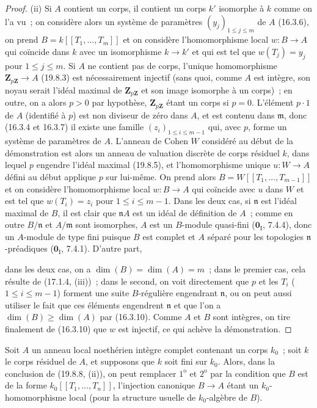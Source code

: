 \begin{proof}
\medskip
\noindent(ii)\enspace
Si $A$ contient un corps, il contient un corps $k'$ isomorphe à $k$ comme on
l'a vu~; on considère alors un système de paramètres
$(y_j)_{1\leq j\leq m}$ de $A$ (16.3.6), on prend
$B=k[[T_1,\ldots,T_m]]$ et on considère l'homomorphisme local $w:B\to A$ qui
coïncide dans $k$ avec un isomorphisme $k\to k'$ et qui est tel que
$w(T_j)=y_j$ pour $1\leq j\leq m$. Si $A$ ne contient pas de corps, l'unique
homomorphisme $\mathbf Z_{p\mathbf Z}\to A$ (19.8.3) est nécessairement
injectif (sans quoi, comme $A$ est intègre, son noyau serait l'idéal maximal de
$\mathbf Z_{p\mathbf Z}$ et son image isomorphe à un corps)~; en outre, on a
alors $p>0$ par hypothèse, $\mathbf Z_{p\mathbf Z}$ étant un corps si $p=0$.
L'élément $p\cdot1$ de $A$ (identifié à $p$) est non diviseur de zéro dans $A$,
et est contenu dans $\mathfrak m$, donc (16.3.4 et 16.3.7) il existe une famille
$(z_i)_{1\leq i\leq m-1}$ qui, avec $p$, forme un système de paramètres de $A$.
L'anneau de Cohen $W$ considéré au début de la démonstration est alors un
anneau de valuation discrète de corps résiduel $k$, dans lequel $p$ engendre
l'idéal maximal (19.8.5), et l'homomorphisme unique $u:W\to A$ défini au début
applique $p$ sur lui-même. On prend alors $B=W[[T_1,\ldots,T_{m-1}]]$ et on
considère l'homomorphisme local $w:B\to A$ qui coïncide avec $u$ dans $W$ et
est tel que $w(T_i)=z_i$ pour $1\leq i\leq m-1$. Dans les deux cas, si
$\mathfrak n$ est l'idéal maximal de $B$, il est clair que $\mathfrak nA$ est
un idéal de définition de $A$~; comme en outre $B/\mathfrak n$ et
$A/\mathfrak m$ sont isomorphes, $A$ est un $B$-module quasi-fini
($\mathbf 0_{\mathrm I}$, 7.4.4), donc un $A$-module de type fini puisque $B$
est complet et $A$ séparé pour les topologies $\mathfrak n$-préadiques
($\mathbf 0_{\mathrm I}$, 7.4.1). D'autre part,


dans les deux cas, on a $\dim(B)=\dim(A)=m$~; dans le premier cas, cela résulte
de (17.1.4, (iii))~; dans le second, on voit directement que $p$ et les $T_i$
($1\leq i\leq m-1$) forment une suite $B$-régulière engendrant $\mathfrak n$,
ou on peut aussi utiliser le fait que ces éléments engendrent $\mathfrak n$ et
que l'on a $\dim(B)\geq\dim(A)$ par (16.3.10). Comme $A$ et $B$ sont intègres,
on tire finalement de (16.3.10) que $w$ est injectif, ce qui achève la
démonstration.
\end{proof}

\begin{corollary}[19.8.9]
\label{0.19.8.9-fr}
Soit $A$ un anneau local noethérien intègre complet contenant un corps $k_0$~;
soit $k$ le corps résiduel de $A$, et supposons que $k$ soit fini sur $k_0$.
Alors, dans la conclusion de (19.8.8, (ii)), on peut remplacer $1^{\mathrm o}$
et $2^{\mathrm o}$ par la condition que $B$ est de la forme
$k_0[[T_1,\ldots,T_n]]$, l'injection canonique $B\to A$ étant un
$k_0$-homomorphisme local (pour la structure usuelle de $k_0$-algèbre de $B$).
\end{corollary}

